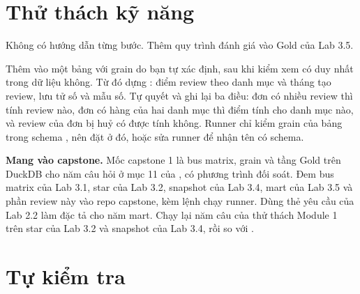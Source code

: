 \section{Thử thách kỹ năng}

\begin{thuthach}
Không có hướng dẫn từng bước. Thêm quy trình đánh giá vào Gold của Lab 3.5.

Thêm vào  một bảng  với grain do bạn tự xác định, sau khi kiểm xem  có duy nhất trong dữ liệu không. Từ đó dựng : điểm review theo danh mục và tháng tạo review, lưu tử số và mẫu số. Tự quyết và ghi lại ba điều: đơn có nhiều review thì tính review nào, đơn có hàng của hai danh mục thì điểm tính cho danh mục nào, và review của đơn bị huỷ có được tính không. Runner chỉ kiểm grain của bảng trong schema , nên đặt  ở đó, hoặc sửa runner để  nhận tên có schema.

\textbf{Mang vào capstone.} Mốc capstone 1 là bus matrix, grain và tầng Gold trên DuckDB cho năm câu hỏi ở mục 11 của , có phương trình đối soát. Đem bus matrix của Lab 3.1, star của Lab 3.2, snapshot của Lab 3.4, mart của Lab 3.5 và phần review này vào repo capstone, kèm lệnh chạy runner. Dùng thẻ yêu cầu của Lab 2.2 làm đặc tả cho năm mart. Chạy lại năm câu của thử thách Module 1 trên star của Lab 3.2 và snapshot của Lab 3.4, rồi so với .
\end{thuthach}

\section{Tự kiểm tra}

